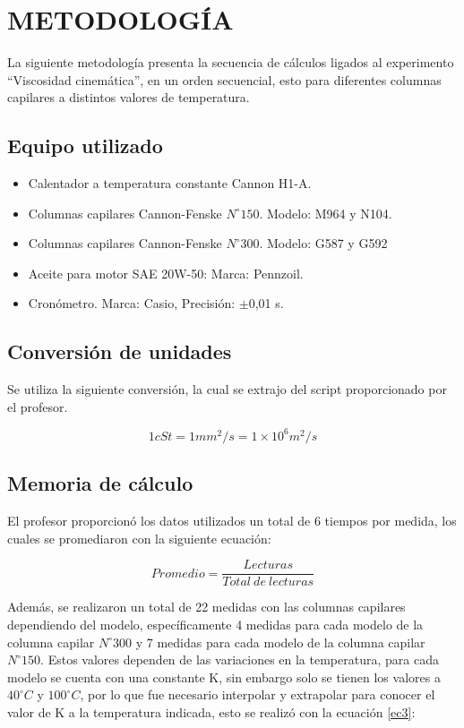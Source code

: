 \documentclass[12, letterpaper]{article}
\begin{document}
\section{METODOLOGÍA}

La siguiente metodología presenta la secuencia de cálculos ligados al experimento “Viscosidad cinemática”, en un orden secuencial, esto para diferentes columnas capilares a distintos valores de temperatura.

\subsection{Equipo utilizado}
\begin{itemize}
    \item Calentador a temperatura constante Cannon H1-A.
    \item Columnas capilares Cannon-Fenske $N^{\circ}150$. Modelo: M964 y N104.
    \item Columnas capilares Cannon-Fenske $N^{\circ}300$. Modelo: G587 y G592
    \item Aceite para motor SAE 20W-50: Marca: Pennzoil.
    \item Cronómetro. Marca: Casio, Precisión: $\pm$0,01 s.
\end{itemize}

\subsection{Conversión de unidades}
Se utiliza la siguiente conversión, la cual se extrajo del script proporcionado por el profesor.

\begin{equation}
\label{ec1}
1 cSt = 1 mm^{2}/s = 1\times10^{6} m^{2}/s
\end{equation}

\subsection{Memoria de cálculo}

El profesor proporcionó los datos utilizados un total de 6 tiempos por medida, los cuales se promediaron con la siguiente ecuación:

\begin{equation}
\label{ec2}
Promedio = \frac{Lecturas}{Total \> de \> lecturas}
\end{equation}

Además, se realizaron un total de 22 medidas con las columnas capilares dependiendo del modelo, específicamente 4 medidas para cada modelo de la columna capilar $N^{\circ}300$ y 7 medidas para cada modelo de la columna capilar $N^{\circ}150$. Estos valores dependen de las variaciones en la temperatura, para cada modelo se cuenta con una constante K, sin embargo solo se tienen los valores a $40^{\circ}C$ y $100^{\circ}C$, por lo que fue necesario interpolar y extrapolar para conocer el valor de K a la temperatura indicada, esto se realizó con la ecuación \ref{ec3}:
\end{document}
